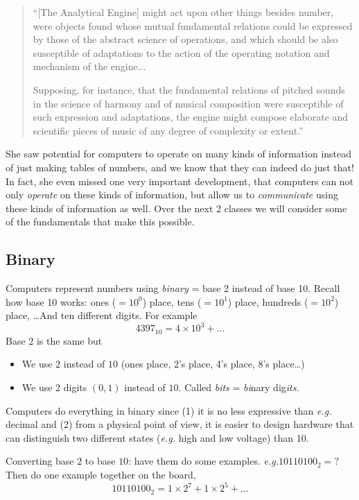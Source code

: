 \documentclass{article}
\newcommand{\eg}{\emph{e.g.}\xspace}
\begin{document}
\begin{quote}
``[The Analytical Engine] might act upon other things besides number,
were objects found whose mutual fundamental relations could be
expressed by those of the abstract science of operations, and which
should be also susceptible of adaptations to the action of the
operating notation and mechanism of the engine...

Supposing, for instance, that the fundamental relations of pitched
sounds in the science of harmony and of musical composition were
susceptible of such expression and adaptations, the engine might
compose elaborate and scientific pieces of music of any degree of
complexity or extent.''
\end{quote}

She saw potential for computers to operate on many kinds of
information instead of just making tables of numbers, and we know that
they can indeed do just that!  In fact, she even missed one very
important development, that computers can not only \emph{operate} on
these kinds of information, but allow us to \emph{communicate} using
these kinds of information as well.  Over the next 2 classes we will
consider some of the fundamentals that make this possible.

\subsection*{Binary}

Computers represent numbers using \emph{binary} = base 2 instead of
base 10.  Recall how base 10 works: ones ($=10^0$) place, tens
($=10^1$) place, hundreds ($=10^2$) place, \dots  And ten different
digits.  For example \[ 4397_{10} = 4 \times 10^3 + \dots \] Base 2 is
the same but
\begin{itemize}
\item We use $2$ instead of $10$ (ones place, 2's place, 4's place,
  8's place\dots)
\item We use $2$ digits $(0,1)$ instead of $10$.  Called \emph{bits} =
  \emph{bi}nary dig\emph{its}.
\end{itemize}
Computers do everything in binary since (1) it is no less expressive
than \eg decimal and (2) from a physical point of view, it is easier
to design hardware that can distinguish two different states
(\eg high and low voltage) than 10.

Converting base $2$ to base $10$: have them do some
examples. \eg $10110100_2 = ?$  Then do one example together on the
board, \[ 10110100_2 = 1 \times 2^7 + 1 \times 2^5 + \dots \]
\end{document}
